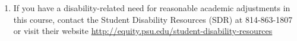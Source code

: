 \documentclass[10pt]{article}
\begin{document}
\begin{enumerate}
\item If you have a disability-related need for
reasonable academic adjustments in this course, contact the Student Disability Resources (SDR) at 814-863-1807 or visit their website \url{http://equity.psu.edu/student-disability-resources}
\end{enumerate}



\end{document}
